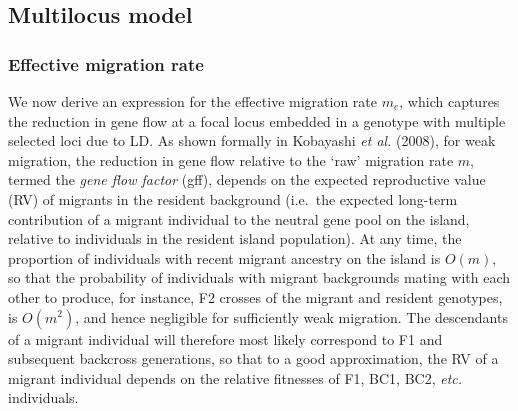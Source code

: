 \documentclass[
  11pt,
]{article}
\begin{document}
\hypertarget{sec:ml}{%
\subsection{Multilocus model}\label{sec:ml}}

\hypertarget{effective-migration-rate}{%
\subsubsection{Effective migration
rate}\label{effective-migration-rate}}

We now derive an expression for the effective migration rate \(m_e\),
which captures the reduction in gene flow at a focal locus embedded in a
genotype with multiple selected loci due to LD. As shown formally in
Kobayashi \emph{et al.} (2008), for weak migration, the reduction in
gene flow relative to the `raw' migration rate \(m\), termed the
\emph{gene flow factor} (gff), depends on the expected reproductive
value (RV) of migrants in the resident background (i.e.~the expected
long-term contribution of a migrant individual to the neutral gene pool
on the island, relative to individuals in the resident island
population). At any time, the proportion of individuals with recent
migrant ancestry on the island is \(O(m)\), so that the probability of
individuals with migrant backgrounds mating with each other to produce,
for instance, F2 crosses of the migrant and resident genotypes, is
\(O(m^2)\), and hence negligible for sufficiently weak migration. The
descendants of a migrant individual will therefore most likely
correspond to F1 and subsequent backcross generations, so that to a good
approximation, the RV of a migrant individual depends on the relative
fitnesses of F1, BC1, BC2, \emph{etc.} individuals.
\end{document}
